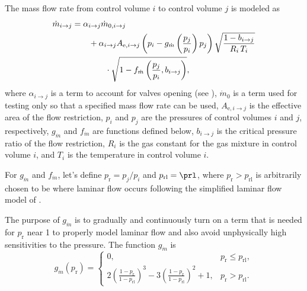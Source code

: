 The mass flow rate from control volume $i$ to control volume $j$ is modeled as
\begin{align}
    \dot{m}_{i \rightarrow j} &= \alpha_{i \rightarrow j} \dot{m}_{0,i \rightarrow j} \notag \\
                                    &\qquad+ \alpha_{i \rightarrow j} A_{\text{e}, i \rightarrow j} \left(p_i - g_{\dot{m}}\left(\frac{p_j}{p_i}\right) p_j\right)
                                    \sqrt{\frac{1 - b_{i \rightarrow j}}{R_i \, T_i}} \notag \\
                                    &\qquad\qquad \cdot \sqrt{1 - f_{\dot{m}}\left(\frac{p_j}{p_i}, b_{i \rightarrow j}\right)},
\end{align}
where
$\alpha_{i \rightarrow j}$ is a term to account for valves opening (see ),
$\dot{m}_{0}$ is a term used for testing only so that a specified mass flow rate can be used,
$A_{\text{e}, i \rightarrow j}$ is the effective area of the flow restriction,
$p_i$ and $p_j$ are the pressures of control volumes $i$ and $j$, respectively,
$g_{\dot{m}}$ and $f_{\dot{m}}$ are functions defined below,
$b_{i \rightarrow j}$ is the critical pressure ratio of the flow restriction,
$R_i$ is the gas constant for the gas mixture in control volume $i$, and
$T_i$ is the temperature in control volume $i$.

For $g_{\dot{m}}$ and $f_{\dot{m}}$, let's define $p_\text{r} = p_j/p_i$ and $p_\text{rl} = \prl$, where $p_\text{r} > p_\text{rl}$ is arbitrarily chosen to be where laminar flow occurs following the simplified laminar flow model of \citet[p.~46]{beater_pneumatic_2007}.

The purpose of $g_{\dot{m}}$ is to gradually and continuously turn on a term that is needed for $p_\text{r}$ near 1 to properly model laminar flow and also avoid unphysically high sensitivities to the pressure.
The function $g_{\dot{m}}$ is
\begin{equation}
    g_{\dot{m}}(p_\text{r}) =
    \begin{cases}
        0,                                                                   & p_\text{r} \leq p_\text{rl},    \\
        2 {\left(\frac{1 - p_\text{r}}{1 - p_\text{rl}}\right)}^3 
            - 3 {\left(\frac{1 - p_\text{r}}{1 - p_\text{rl}}\right)}^2 + 1, & p_\text{r} > p_\text{rl}.
    \end{cases}
\end{equation}

